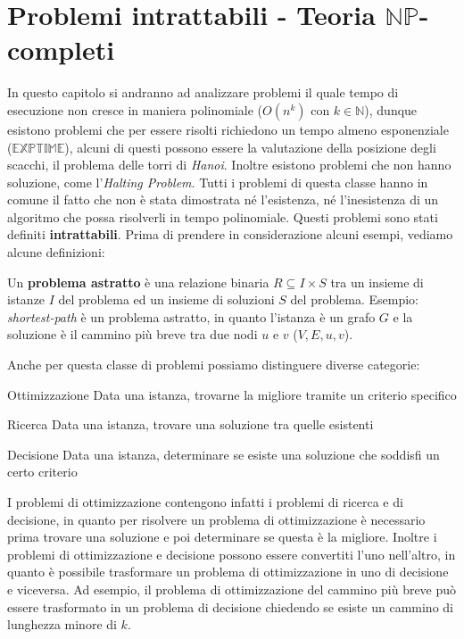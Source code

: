 \chapter{\texorpdfstring{Problemi intrattabili - Teoria $\mathbb{NP}$-completi}{Problemi intrattabili - Teoria NP-completi}}

In questo capitolo si andranno ad analizzare problemi il quale tempo di esecuzione non cresce in maniera polinomiale ($O(n^k)$ con $k\in\mathbb{N}$), dunque esistono problemi che per essere risolti richiedono un tempo almeno esponenziale ($\mathbb{EXPTIME}$), alcuni di questi possono essere la valutazione della posizione degli scacchi, il problema delle torri di \textit{Hanoi}. Inoltre esistono problemi che non hanno soluzione, come l'\textit{Halting Problem}.\newline
Tutti i problemi di questa classe hanno in comune il fatto che non è stata dimostrata né l'esistenza, né l'inesistenza di un algoritmo che possa risolverli in tempo polinomiale. Questi problemi sono stati definiti \textbf{intrattabili}.\newline
Prima di prendere in considerazione alcuni esempi, vediamo alcune definizioni:
\begin{definition}
    Un \textbf{problema astratto} è una relazione binaria $R\subseteq I\times S$ tra un insieme di istanze $I$ del problema ed un insieme di soluzioni $S$ del problema.\newline
    Esempio: \textit{shortest-path} è un problema astratto, in quanto l'istanza è un grafo $G$ e la soluzione è il cammino più breve tra due nodi $u$ e $v$ ($V,E,u,v$).
\end{definition}
Anche per questa classe di problemi possiamo distinguere diverse categorie:
\begin{definition}
    \item[Ottimizzazione] Data una istanza, trovarne la migliore tramite un criterio specifico
    \item[Ricerca] Data una istanza, trovare una soluzione tra quelle esistenti
    \item[Decisione] Data una istanza, determinare se esiste una soluzione che soddisfi un certo criterio
\end{definition}
I problemi di ottimizzazione contengono infatti i problemi di ricerca e di decisione, in quanto per risolvere un problema di ottimizzazione è necessario prima trovare una soluzione e poi determinare se questa è la migliore. Inoltre i problemi di ottimizzazione e decisione possono essere convertiti l'uno nell'altro, in quanto è possibile trasformare un problema di ottimizzazione in uno di decisione e viceversa. Ad esempio, il problema di ottimizzazione del cammino più breve può essere trasformato in un problema di decisione chiedendo se esiste un cammino di lunghezza minore di $k$.
